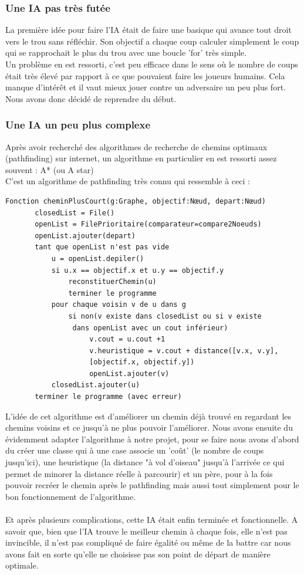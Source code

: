 \documentclass{article}
\begin{document}
\subsubsection{Une IA pas très futée}
La première idée pour faire l'IA était de faire une basique qui avance tout droit vers le trou sans réfléchir. Son objectif a chaque coup calculer simplement le coup qui se rapprochait le plus du trou avec une boucle 'for' très simple.\\
Un problème en est ressorti, c'est peu efficace dans le sens où le nombre de coups était très élevé par rapport à ce que pouvaient faire les joueurs humains. Cela manque d'intérêt et il vaut mieux jouer contre un adversaire un peu plus fort. Nous avons donc décidé de reprendre du début.\\
\subsubsection{Une IA un peu plus complexe}
Après avoir recherché des algorithmes de recherche de chemins optimaux (pathfinding) sur internet, un algorithme en particulier en est ressorti assez souvent : A* (ou A star)\\
C'est un algorithme de pathfinding très connu qui ressemble à ceci :
\begin{verbatim}
Fonction cheminPlusCourt(g:Graphe, objectif:Nœud, depart:Nœud)
       closedList = File()
       openList = FilePrioritaire(comparateur=compare2Noeuds)
       openList.ajouter(depart)
       tant que openList n'est pas vide
           u = openList.depiler()
           si u.x == objectif.x et u.y == objectif.y
               reconstituerChemin(u)
               terminer le programme
           pour chaque voisin v de u dans g
               si non(v existe dans closedList ou si v existe
                dans openList avec un cout inférieur)
                    v.cout = u.cout +1 
                    v.heuristique = v.cout + distance([v.x, v.y], 
                    [objectif.x, objectif.y])
                    openList.ajouter(v)
           closedList.ajouter(u)
       terminer le programme (avec erreur)
\end{verbatim}
L'idée de cet algorithme est d'améliorer un chemin déjà trouvé en regardant les chemins voisins et ce jusqu'à ne plus pouvoir l'améliorer. Nous avons ensuite du évidemment adapter l'algorithme à notre projet, pour se faire nous avons d'abord du créer une classe qui à une case associe un 'coût' (le nombre de coups jusqu'ici), une heuristique (la distance "à vol d'oiseau" jusqu'à l'arrivée ce qui permet de minorer la distance réelle à parcourir) et un père, pour à la fois pouvoir recréer le chemin après le pathfinding mais aussi tout simplement pour le bon fonctionnement de l'algorithme. \\~\\
Et après plusieurs complications, cette IA était enfin terminée et fonctionnelle. A savoir que, bien que l'IA trouve le meilleur chemin à chaque fois, elle n'est pas invincible, il n'est pas compliqué de faire égalité ou même de la battre car nous avons fait en sorte qu'elle ne choisisse pas son point de départ de manière optimale.
\newpage
\end{document}
